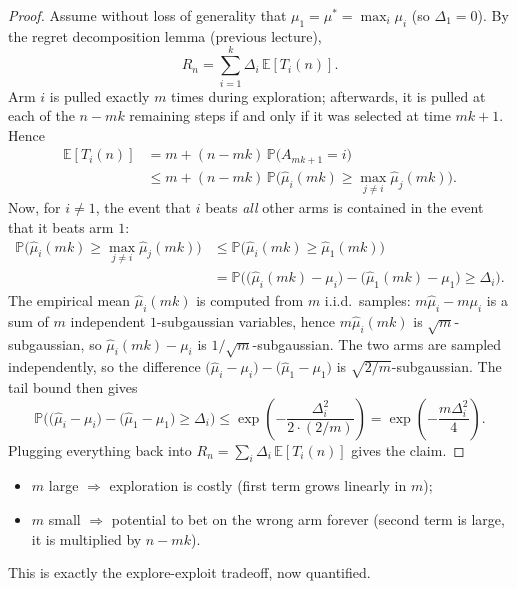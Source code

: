 \begin{proof}
Assume without loss of generality that $\mu_1 = \mu^* = \max_i \mu_i$ (so $\Delta_1 = 0$). By the regret decomposition lemma (previous lecture),
\[
R_n = \sum_{i=1}^k \Delta_i\, \mathbb{E}[T_i(n)].
\]
Arm $i$ is pulled exactly $m$ times during exploration; afterwards, it is pulled at each of the $n - mk$ remaining steps if and only if it was selected at time $mk+1$. Hence
\begin{align*}
\mathbb{E}[T_i(n)] &= m + (n - mk)\,\mathbb{P}\big(A_{mk+1} = i\big) \\
&\leq m + (n - mk)\,\mathbb{P}\Big(\hat{\mu}_i(mk) \geq \max_{j \neq i}\hat{\mu}_j(mk)\Big).
\end{align*}
Now, for $i \neq 1$, the event that $i$ beats \emph{all} other arms is contained in the event that it beats arm $1$:
\begin{align*}
\mathbb{P}\Big(\hat{\mu}_i(mk) \geq \max_{j \neq i}\hat{\mu}_j(mk)\Big) &\leq \mathbb{P}\big(\hat{\mu}_i(mk) \geq \hat{\mu}_1(mk)\big) \\
&= \mathbb{P}\Big(\big(\hat{\mu}_i(mk) - \mu_i\big) - \big(\hat{\mu}_1(mk) - \mu_1\big) \geq \Delta_i\Big).
\end{align*}
The empirical mean $\hat{\mu}_i(mk)$ is computed from $m$ i.i.d.\ samples: $m\hat{\mu}_i - m\mu_i$ is a sum of $m$ independent $1$-subgaussian variables, hence $m\hat{\mu}_i(mk)$ is $\sqrt{m}$-subgaussian, so $\hat{\mu}_i(mk) - \mu_i$ is $1/\sqrt{m}$-subgaussian. The two arms are sampled independently, so the difference $\big(\hat{\mu}_i - \mu_i\big) - \big(\hat{\mu}_1 - \mu_1\big)$ is $\sqrt{2/m}$-subgaussian. The tail bound then gives
\[
\mathbb{P}\Big(\big(\hat{\mu}_i - \mu_i\big) - \big(\hat{\mu}_1 - \mu_1\big) \geq \Delta_i\Big) \leq \exp\left(-\frac{\Delta_i^2}{2\cdot(2/m)}\right) = \exp\left(-\frac{m\Delta_i^2}{4}\right).
\]
Plugging everything back into $R_n = \sum_i \Delta_i\,\mathbb{E}[T_i(n)]$ gives the claim.
\end{proof}

\begin{remark}[Tradeoff]

\begin{itemize}
    \item $m$ large $\Rightarrow$ exploration is costly (first term grows linearly in $m$);
    \item $m$ small $\Rightarrow$ potential to bet on the wrong arm forever (second term is large, it is multiplied by $n - mk$).
\end{itemize}
This is exactly the explore-exploit tradeoff, now quantified.
\end{remark}

